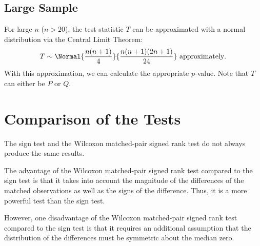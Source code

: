\subsection{Large Sample}

For large $n$ ($n > 20$), the test statistic $T$ can be approximated with a normal distribution via the Central Limit Theorem: \[T \sim \Normal{\frac{n(n+1)}4}{\frac{n(n+1)(2n+1)}{24}} \text{ approximately}.\] With this approximation, we can calculate the appropriate $p$-value. Note that $T$ can either be $P$ or $Q$.

\section{Comparison of the Tests}

The sign test and the Wilcoxon matched-pair signed rank test do not always produce the same results.

The advantage of the Wilcoxon matched-pair signed rank test compared to the sign test is that it takes into account the magnitude of the differences of the matched observations as well as the signs of the difference. Thus, it is a more powerful test than the sign test.

However, one disadvantage of the Wilcoxon matched-pair signed rank test compared to the sign test is that it requires an additional assumption that the distribution of the differences must be symmetric about the median zero.